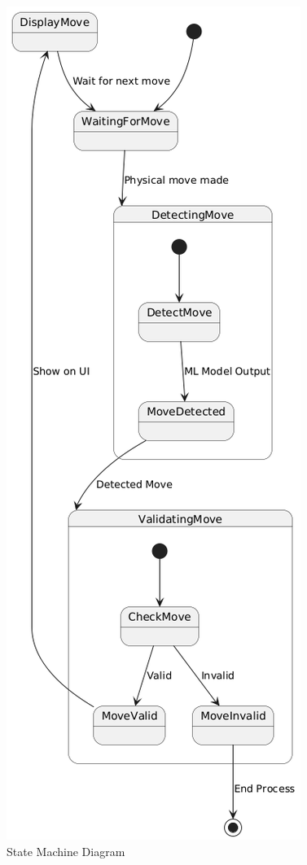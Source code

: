 \begin{figure}[h!]
\begin{minipage}[t]{0.5\textwidth}
        \includegraphics[width=\linewidth]{figures/results/uml/state-machine.png}
        \caption[State Machine Diagram]{State Machine Diagram}
        \label{fig:state-machine}
    \end{minipage}
\end{figure}


